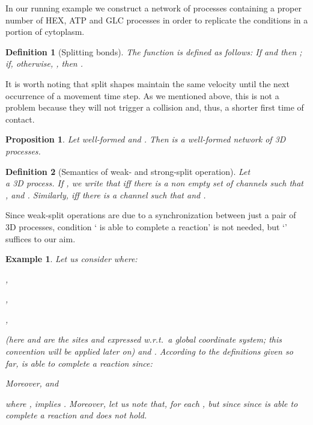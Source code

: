 \documentclass[11pt]{article}
\newtheorem{example}{Example}
\newtheorem{definition}{Definition}
\newtheorem{proposition}{Proposition}
\begin{document}
In our running example we construct a network of processes containing a proper number of HEX, ATP
and GLC processes in order to replicate the conditions in a portion of cytoplasm.

\begin{definition}[Splitting bonds]\label{def:split}
The function  is defined as follows:
If  and  then ; if, otherwise, , then
.
\end{definition}

It is worth noting that split shapes maintain the same velocity until the next occurrence of a
movement time step. As we mentioned above, this is not a problem because they will not trigger a
collision and, thus, a shorter first time of contact.

\begin{proposition}\label{prop:split-closure}
Let  well-formed and . Then  is a well-formed
network of 3D processes.
\end{proposition}


\begin{definition}[Semantics of weak- and strong-split operation] \label{def:creaction}
Let\\
\noindent  a 3D process. If , we write that  iff
there is a non empty set of channels  such that ,   and . Similarly,  iff there is a
channel  such that  and .
\end{definition}

Since weak-split operations are due to a synchronization between just a pair of 3D processes,
condition ` is able to complete a reaction' is not needed, but `'
suffices to our aim.

\begin{example}
Let us consider  where:

\begin{description}
\item ,

\item  ,

\item ,
\end{description}


\noindent  (here   and  are the sites 
and  expressed w.r.t.\ a global coordinate system; this convention will be applied later
on)  and . According to the definitions given so far,  is {\em able to complete a reaction} since:

\noindent Moreover,  and

\noindent  where , implies . Moreover, let us note that, for each ,  but  since since  is able to complete a reaction and  does not hold.
\end{example}
\end{document}
